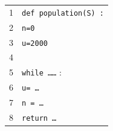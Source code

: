 \documentclass[10pt]{article}
\begin{document}
\begin{enumerate}
\begin{minipage}{0.58\linewidth}
\end{minipage}\hfill
\begin{minipage}{0.38\linewidth}
\begin{tabular}{|c l|}\hline
1&\texttt{def population(S) :}\\
2&\quad \texttt{n=0}\\
3&\quad \texttt{u=2000}\\
4& \\
5&\quad \texttt{while \ldots\ldots} :\\
6&\quad \quad \texttt{u= \ldots}\\
7&\quad \quad \texttt{n = \ldots}\\
8&\quad \texttt{return \ldots}\\ \hline
\end{tabular}
\end{minipage}
\end{enumerate}

\bigskip
\end{document}

